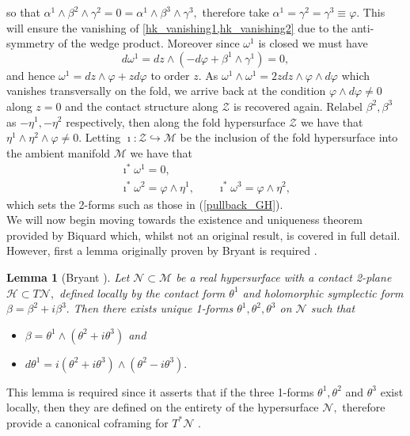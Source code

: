 \documentclass[a4paper,12pt, onecolumn, notitlepage]{article}
\newtheorem{lem}[thm]{Lemma}
\theoremstyle{definition}
\theoremstyle{remark}
\newcommand{\al}{\alpha}
\newcommand{\w}{\omega}
\newcommand{\vp}{\varphi}
\begin{document}
so that $\al^{1}\wedge\beta^{2}\wedge\gamma^{2} = 0 = \al^{1}\wedge\beta^{3}\wedge\gamma^{3},$ therefore take $\al^{1}=\gamma^{2}=\gamma^{3}\equiv\varphi.$ This will ensure the vanishing of \cref{hk_vanishing1,hk_vanishing2} due to the anti-symmetry of the wedge product. Moreover since $\w^{1}$ is closed we must have 
\begin{equation*}
	d\w^{1}	= dz\wedge (-d\varphi + \beta^{1}\wedge\gamma^{1})
	= 0,
\end{equation*}
and hence $\w^{1} = dz\wedge\varphi + zd\varphi$ to order $z.$ As $\w^{1}\wedge\w^{1} = 2zdz\wedge\varphi\wedge d\varphi$ which vanishes transversally on the fold, we arrive back at the condition $\varphi\wedge d\varphi\neq 0$ along $z=0$ and the contact structure along $\mathcal{Z}$ is recovered again. Relabel $\beta^{2},\beta^{3}$ as $-\eta^{1}, -\eta^{2}$ respectively, then along the fold hypersurface $\mathcal{Z}$ we have that $\eta^{1}\wedge\eta^{2}\wedge\vp\neq 0.$ Letting $\imath:\mathcal{Z}\hookrightarrow\mathcal{M}$ be the inclusion of the fold hypersurface into the ambient manifold $\mathcal{M}$ we have that
\begin{gather}
	\imath^{\ast}\w^{1} = 0,\nonumber\\
	\label{k_pullbacks}
	\imath^{\ast}\w^{2} = \vp\wedge\eta^{1},\qquad \imath^{\ast}\w^{3} = \vp\wedge\eta^{2},
\end{gather}
which sets the 2-forms such as those in (\ref{pullback_GH}).\\
We will now begin moving towards the existence and uniqueness theorem provided by Biquard which, whilst not an original result, is covered in full detail. However, first a lemma originally proven by Bryant is required \cite{bryant_2004}.\\

\begin{lem}[Bryant \cite{bryant_2004}]
	\label{bryant}
	Let $\mathcal{N}\subset\mathcal{M}$ be a real hypersurface with a contact 2-plane $\mathcal{H}\subset T\mathcal{N},$ defined locally by the contact form $\theta^{1}$ and holomorphic symplectic form $\beta = \beta^{2} + i\beta^{3}.$ Then there exists unique 1-forms $\theta^{1},\theta^{2},\theta^{3}$ on $\mathcal{N}$ such that
	\begin{itemize}
		\item $\beta = \theta^{1}\wedge(\theta^{2}+i\theta^{3})$ and
		\item $d\theta^{1}=i(\theta^{2}+i\theta^{3})\wedge (\theta^{2}-i\theta^{3}).$\\
	\end{itemize}
\end{lem}
This lemma is required since it asserts that if the three 1-forms $\theta^{1},\theta^{2}$ and $\theta^{3}$ exist locally, then they are defined on the entirety of the hypersurface $\mathcal{N},$ therefore provide a canonical coframing for $T^{\ast}\mathcal{N}$ \cite{bryant_2004}.\\
\end{document}
